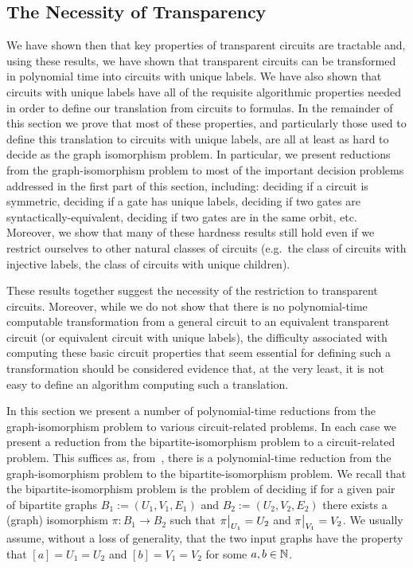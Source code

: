 \documentclass[../main/thesis.tex]{subfiles}
\begin{document}
\subsection{The Necessity of Transparency}\label{sec:necessity}

We have shown then that key properties of transparent circuits are tractable
and, using these results, we have shown that transparent circuits can be
transformed in polynomial time into circuits with unique labels. We have also
shown that circuits with unique labels have all of the requisite algorithmic
properties needed in order to define our translation from circuits to formulas.
In the remainder of this section we prove that most of these properties, and
particularly those used to define this translation to circuits with unique
labels, are all at least as hard to decide as the graph isomorphism problem. In
particular, we present reductions from the graph-isomorphism problem to most of
the important decision problems addressed in the first part of this section,
including: deciding if a circuit is symmetric, deciding if a gate has unique
labels, deciding if two gates are syntactically-equivalent, deciding if two
gates are in the same orbit, etc. Moreover, we show that many of these hardness
results still hold even if we restrict ourselves to other natural classes of
circuits (e.g.\ the class of circuits with injective labels, the class of
circuits with unique children).

These results together suggest the necessity of the restriction to transparent
circuits. Moreover, while we do not show that there is no polynomial-time
computable transformation from a general circuit to an equivalent transparent
circuit (or equivalent circuit with unique labels), the difficulty associated
with computing these basic circuit properties that seem essential for defining
such a transformation should be considered evidence that, at the very least, it
is not easy to define an algorithm computing such a translation.

\begin{remark}
  In this section we present a number of polynomial-time reductions from the
  graph-isomorphism problem to various circuit-related problems. In each case we
  present a reduction from the bipartite-isomorphism problem to a
  circuit-related problem. This suffices as, from~\cite{Zemlyachenko1985}, there
  is a polynomial-time reduction from the graph-isomorphism problem to the
  bipartite-isomorphism problem. We recall that the bipartite-isomorphism
  problem is the problem of deciding if for a given pair of bipartite graphs
  $B_1 := (U_1, V_1, E_1)$ and $B_2 := (U_2, V_2, E_2)$ there exists a (graph)
  isomorphism $\pi : B_1 \rightarrow B_2$ such that $\restr{\pi}{U_1} = U_2$ and
  $\restr{\pi}{V_1} = V_2$. We usually assume, without a loss of generality,
  that the two input graphs have the property that $[a] = U_1 = U_2$ and $[b] =
  V_1 = V_2$ for some $a,b \in \mathbb{N}$.
\end{remark}
\end{document}
